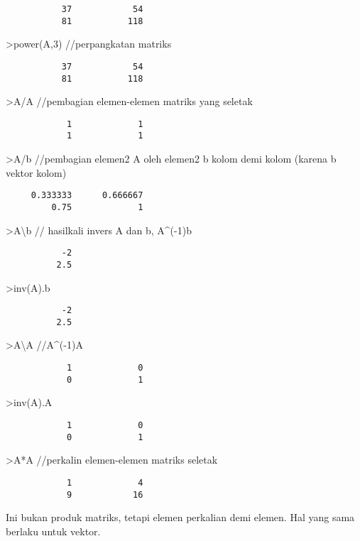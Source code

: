\documentclass[
]{book}
\begin{document}
\begin{verbatim}
           37            54 
           81           118 
\end{verbatim}

\textgreater power(A,3) //perpangkatan matriks

\begin{verbatim}
           37            54 
           81           118 
\end{verbatim}

\textgreater A/A //pembagian elemen-elemen matriks yang seletak

\begin{verbatim}
            1             1 
            1             1 
\end{verbatim}

\textgreater A/b //pembagian elemen2 A oleh elemen2 b kolom demi kolom (karena b vektor kolom)

\begin{verbatim}
     0.333333      0.666667 
         0.75             1 
\end{verbatim}

\textgreater A\textbackslash b // hasilkali invers A dan b, A\^{}(-1)b

\begin{verbatim}
           -2 
          2.5 
\end{verbatim}

\textgreater inv(A).b

\begin{verbatim}
           -2 
          2.5 
\end{verbatim}

\textgreater A\textbackslash A //A\^{}(-1)A

\begin{verbatim}
            1             0 
            0             1 
\end{verbatim}

\textgreater inv(A).A

\begin{verbatim}
            1             0 
            0             1 
\end{verbatim}

\textgreater A*A //perkalin elemen-elemen matriks seletak

\begin{verbatim}
            1             4 
            9            16 
\end{verbatim}

Ini bukan produk matriks, tetapi elemen perkalian demi elemen. Hal yang sama berlaku untuk vektor.
\end{document}
